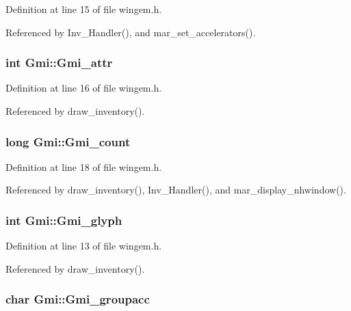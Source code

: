 Definition at line 15 of file wingem.\+h.



Referenced by Inv\+\_\+\+Handler(), and mar\+\_\+set\+\_\+accelerators().

\hypertarget{structGmi_a630141d7acc3e1b08fe64024b7d1fd0e}{
\subsubsection[{Gmi\+\_\+attr}]{\setlength{\rightskip}{0pt plus 5cm}int Gmi\+::\+Gmi\+\_\+attr}}\label{structGmi_a630141d7acc3e1b08fe64024b7d1fd0e}


Definition at line 16 of file wingem.\+h.



Referenced by draw\+\_\+inventory().

\hypertarget{structGmi_aa3b75743e1b8592831b42e7df93561f1}{
\subsubsection[{Gmi\+\_\+count}]{\setlength{\rightskip}{0pt plus 5cm}long Gmi\+::\+Gmi\+\_\+count}}\label{structGmi_aa3b75743e1b8592831b42e7df93561f1}


Definition at line 18 of file wingem.\+h.



Referenced by draw\+\_\+inventory(), Inv\+\_\+\+Handler(), and mar\+\_\+display\+\_\+nhwindow().

\hypertarget{structGmi_a567ab60c9c47bce3b99f804cb539e745}{
\subsubsection[{Gmi\+\_\+glyph}]{\setlength{\rightskip}{0pt plus 5cm}int Gmi\+::\+Gmi\+\_\+glyph}}\label{structGmi_a567ab60c9c47bce3b99f804cb539e745}


Definition at line 13 of file wingem.\+h.



Referenced by draw\+\_\+inventory().

\hypertarget{structGmi_a66db31adc63094c678299855b62b245f}{
\subsubsection[{Gmi\+\_\+groupacc}]{\setlength{\rightskip}{0pt plus 5cm}char Gmi\+::\+Gmi\+\_\+groupacc}}\label{structGmi_a66db31adc63094c678299855b62b245f}


